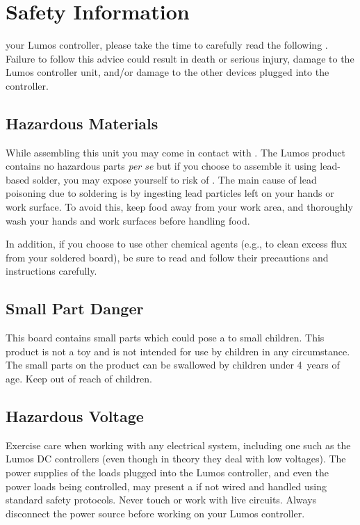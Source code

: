 \documentclass[letterpaper,twoside,onecolumn,openright,final]{memoir}
\begin{document}
\chapter{Safety Information}\label{ch:safety}

 your Lumos controller, please take the time to
carefully read the following .  Failure to follow this advice could
result in death or serious injury, damage to the Lumos controller unit, and/or damage
to the other devices plugged into the controller.

\section{Hazardous Materials}
While assembling this unit you may come in contact with .  The Lumos
product contains no hazardous parts \emph{per se} but if you choose to assemble it using
lead-based solder, you may expose yourself to risk of .  The main cause of lead
poisoning due to soldering is by ingesting lead particles left on your hands or work surface.
To avoid this, keep food away from your work area, and thoroughly wash your hands and work
surfaces before handling food.

In addition, if you choose to use other chemical agents (e.g., to clean excess flux from your
soldered board), be sure to read and follow their precautions and instructions carefully.

\section{Small Part Danger}
This board contains small parts which could pose a  to small children.
This product is not a toy and is not intended for use by children in any circumstance.
The small parts on the product can be swallowed by children under 4~years of age. Keep
out of reach of children.

\section{Hazardous Voltage}
Exercise care when working with any electrical system, including one such as the Lumos DC
controllers (even though in theory they deal with low voltages).  The power supplies of the
loads plugged into the Lumos controller, and even the power loads being controlled, may present
a  if not wired and handled using standard safety protocols.  Never touch or work
with live circuits. Always disconnect the power source before working on your Lumos controller.
\end{document}
